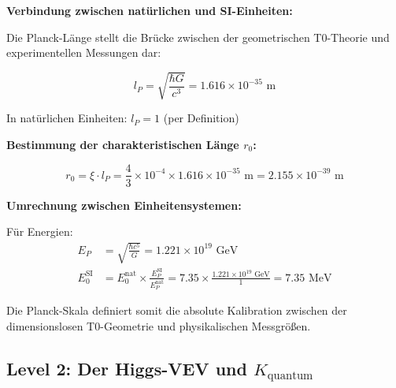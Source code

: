 \documentclass[12pt,a4paper]{article}
\newcommand{\xipar}{\xi}
\newcommand{\Kquantum}{K_{\text{quantum}}}
\begin{document}
	\begin{keyresult}
		\textbf{Verbindung zwischen natürlichen und SI-Einheiten:}
		
		Die Planck-Länge stellt die Brücke zwischen der geometrischen T0-Theorie und experimentellen Messungen dar:
		
		\begin{equation}
			l_P = \sqrt{\frac{\hbar G}{c^3}} = 1.616 \times 10^{-35} \text{ m}
		\end{equation}
		
		In natürlichen Einheiten: $l_P = 1$ (per Definition)
		
		\textbf{Bestimmung der charakteristischen Länge $r_0$:}
		
		\begin{equation}
			r_0 = \xipar \cdot l_P = \frac{4}{3} \times 10^{-4} \times 1.616 \times 10^{-35} \text{ m} = 2.155 \times 10^{-39} \text{ m}
		\end{equation}
		
		\textbf{Umrechnung zwischen Einheitensystemen:}
		
		Für Energien:
		\begin{align}
			E_P &= \sqrt{\frac{\hbar c^5}{G}} = 1.221 \times 10^{19} \text{ GeV} \\
			E_0^{\text{SI}} &= E_0^{\text{nat}} \times \frac{E_P^{\text{SI}}}{E_P^{\text{nat}}} = 7.35 \times \frac{1.221 \times 10^{19} \text{ GeV}}{1} = 7.35 \text{ MeV}
		\end{align}
		
		Die Planck-Skala definiert somit die absolute Kalibration zwischen der dimensionslosen T0-Geometrie und physikalischen Messgrößen.
	\end{keyresult}
	
	\subsection{Level 2: Der Higgs-VEV und $\Kquantum$}
	
\end{document}
